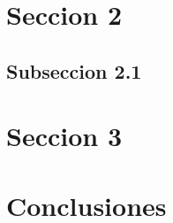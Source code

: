 \documentclass[12pt, a4paper]{article}
\begin{document}
\section{Seccion 2}

\subsection{Subseccion 2.1}

\section{Seccion 3}

\section{Conclusiones}
\end{document}
